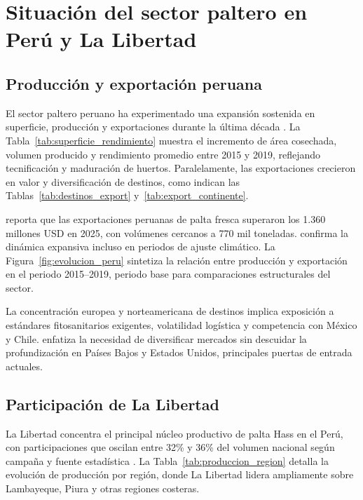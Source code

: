\section{Situaci\'on del sector paltero en Per\'u y La Libertad}

\subsection{Producci\'on y exportaci\'on peruana}

El sector paltero peruano ha experimentado una expansi\'on sostenida en superficie, producci\'on y exportaciones durante la \'ultima d\'ecada \citep{SierraSelva2020, VitteryFlores2023}. La Tabla~\ref{tab:superficie_rendimiento} muestra el incremento de \'area cosechada, volumen producido y rendimiento promedio entre 2015 y 2019, reflejando tecnificaci\'on y maduraci\'on de huertos. Paralelamente, las exportaciones crecieron en valor y diversificaci\'on de destinos, como indican las Tablas~\ref{tab:destinos_export} y~\ref{tab:export_continente}.





\citet{PromPeru2026} reporta que las exportaciones peruanas de palta fresca superaron los 1.360 millones USD en 2025, con vol\'umenes cercanos a 770 mil toneladas. \citet{MIDAGRI2024} confirma la din\'amica expansiva incluso en periodos de ajuste clim\'atico. La Figura~\ref{fig:evolucion_peru} sintetiza la relaci\'on entre producci\'on y exportaci\'on en el periodo 2015--2019, periodo base para comparaciones estructurales del sector.


La concentraci\'on europea y norteamericana de destinos implica exposici\'on a est\'andares fitosanitarios exigentes, volatilidad log\'istica y competencia con M\'exico y Chile. \citet{ComexPeru2025} enfatiza la necesidad de diversificar mercados sin descuidar la profundizaci\'on en Pa\'ises Bajos y Estados Unidos, principales puertas de entrada actuales.

\subsection{Participaci\'on de La Libertad}

La Libertad concentra el principal n\'ucleo productivo de palta Hass en el Per\'u, con participaciones que oscilan entre 32\% y 36\% del volumen nacional seg\'un campa\~na y fuente estad\'istica \citep{VitteryFlores2023, SierraSelva2020}. La Tabla~\ref{tab:produccion_region} detalla la evoluci\'on de producci\'on por regi\'on, donde La Libertad lidera ampliamente sobre Lambayeque, Piura y otras regiones costeras.

